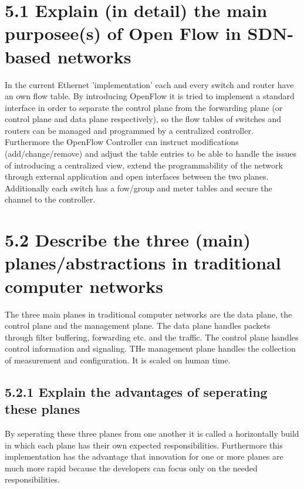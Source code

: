 \documentclass{article}
\begin{document}
	\pagestyle{fancy}
	\hfill
	
	\section*{5.1 Explain (in detail) the main purposee(s) of Open Flow in SDN-based networks}
	\begin{adjustwidth}{2em}{2em}
		In the current Ethernet 'implementation' each and every switch and router have an own flow table. By introducing OpenFlow it is tried to implement a standard interface in order to separate the control plane from the forwarding plane (or control plane and data plane respectively), so the flow tables of switches and routers can be managed and programmed by a centralized controller. \\
		Furthermore the OpenFlow Controller can instruct modifications (add/change/remove) and adjust the table entries to be able to handle the issues of introducing a centralized view, extend the programmability of the network through external application and open interfaces between the two planes. Additionally each switch has a fow/group and meter tables and secure the channel to the controller.
	\end{adjustwidth}
	
	\section*{5.2 Describe the three (main) planes/abstractions in traditional computer networks}
	\begin{adjustwidth}{2em}{2em}
		The three main planes in traditional computer networks are the data plane, the control plane and the management plane. The data plane handles packets through filter buffering, forwarding etc. and the traffic. The control plane handles control information and signaling. THe management plane handles the collection of measurement and configuration. It is scaled on human time.
		\subsection*{5.2.1 Explain the advantages of seperating these planes}
		\begin{adjustwidth}{2em}{2em}
			By seperating these three planes from one another it is called a horizontally build in which each plane has their own expected responsibilities. Furthermore this implementation has the advantage that innovation for one or more planes are much more rapid because the developers can focus only on the needed responsibilities.
		\end{adjustwidth}
	\end{adjustwidth}
	
\end{document}

